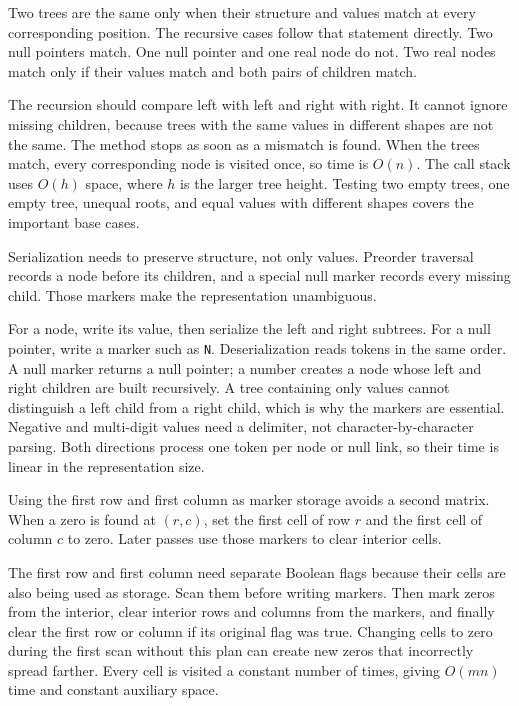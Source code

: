 \expandafter\def\csname sourcewalkthrough@56\endcsname{%
Two trees are the same only when their structure and values match at every
corresponding position. The recursive cases follow that statement directly.
Two null pointers match. One null pointer and one real node do not. Two real
nodes match only if their values match and both pairs of children match.

The recursion should compare left with left and right with right. It cannot
ignore missing children, because trees with the same values in different
shapes are not the same. The method stops as soon as a mismatch is found.
When the trees match, every corresponding node is visited once, so time is
\(O(n)\). The call stack uses \(O(h)\) space, where \(h\) is the larger tree
height. Testing two empty trees, one empty tree, unequal roots, and equal
values with different shapes covers the important base cases.}

\expandafter\def\csname sourcewalkthrough@57\endcsname{%
Serialization needs to preserve structure, not only values. Preorder traversal
records a node before its children, and a special null marker records every
missing child. Those markers make the representation unambiguous.

For a node, write its value, then serialize the left and right subtrees. For a
null pointer, write a marker such as \texttt{N}. Deserialization reads tokens
in the same order. A null marker returns a null pointer; a number creates a
node whose left and right children are built recursively. A tree containing
only values cannot distinguish a left child from a right child, which is why
the markers are essential. Negative and multi-digit values need a delimiter,
not character-by-character parsing. Both directions process one token per
node or null link, so their time is linear in the representation size.}

\expandafter\def\csname sourcewalkthrough@58\endcsname{%
Using the first row and first column as marker storage avoids a second matrix.
When a zero is found at \((r,c)\), set the first cell of row \(r\) and the
first cell of column \(c\) to zero. Later passes use those markers to clear
interior cells.

The first row and first column need separate Boolean flags because their cells
are also being used as storage. Scan them before writing markers. Then mark
zeros from the interior, clear interior rows and columns from the markers, and
finally clear the first row or column if its original flag was true. Changing
cells to zero during the first scan without this plan can create new zeros
that incorrectly spread farther. Every cell is visited a constant number of
times, giving \(O(mn)\) time and constant auxiliary space.}

